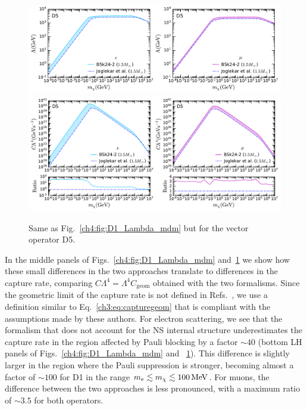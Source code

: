 \begin{figure}[t!bp]
    \centering
    \includegraphics[width=\textwidth]{capture_2/D5_Lambda_mdm_leptons.pdf}\\
    \vspace*{-0.5em}
    \includegraphics[width=\textwidth]{capture_2/D5_C_mdm_leptons.pdf}    
    \caption{Same as Fig.~\ref{ch4:fig:D1_Lambda_mdm} but for the vector operator D5.}
    \label{ch4:fig:D5_Lambda_mdm}
\end{figure}


In the middle panels of Figs.~\ref{ch4:fig:D1_Lambda_mdm} and~\ref{ch4:fig:D5_Lambda_mdm} we show how these small differences in the two approaches translate to differences in the capture rate, comparing $C \Lambda^4 = \Lambda^4 C_\mathrm{geom}$  obtained with the two formalisms. Since the geometric limit of the capture rate is not defined in Refs.~\cite{Joglekar:2019vzy_sep_Relativisticcapturedark,Joglekar:2020liw_Darkkineticheating}, we use a definition similar to Eq.~\ref{ch3:eq:capturegeom} that is compliant with the assumptions made by these authors. For electron scattering, we see that the formalism that does not account for the NS internal structure underestimates the capture rate in the region affected by Pauli blocking by a factor $\sim 40$ (bottom LH panels of Figs.~\ref{ch4:fig:D1_Lambda_mdm} and ~\ref{ch4:fig:D5_Lambda_mdm}). This difference is slightly larger in the region where the Pauli suppression is stronger, becoming almost a factor of $\sim 100$ for D1 in the range $m_e\lesssim m_\chi \lesssim 100{\rm \,MeV}$. For muons, the difference between the two approaches is less pronounced, with a maximum ratio of $\sim 3.5$ for both operators.



